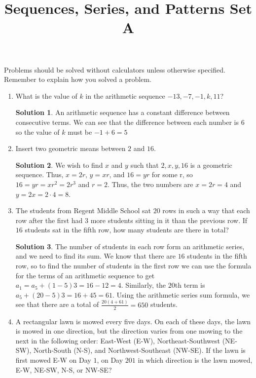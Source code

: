 \documentclass{article}
\title{Sequences, Series, and Patterns Set A}
\date{}
\author{}
\theoremstyle{definition}
\newtheorem*{solution}{Solution}
\begin{document}
    \maketitle
    \noindent Problems should be solved without calculators unless otherwise specified. Remember to explain how you solved a problem.
    \begin{enumerate}
        \item What is the value of $k$ in the arithmetic sequence $-13, -7, -1, k, 11$?
        \begin{solution}
            An arithmetic sequence has a constant difference between consecutive
            terms. We can see that the difference between each number is $6$ so
            the value of $k$ must be $-1 + 6 = 5$
        \end{solution}
        \item Insert two geometric means between $2$ and $16$.
        \begin{solution}
            We wish to find $x$ and $y$ such that $2, x, y, 16$ is a geometric
            sequence. Thus, $x = 2r$, $y = xr$, and $16 = yr$ for some r, so $16
            = yr = xr^2 = 2r^3$ and $r = 2$. Thus, the two numbers are $x = 2r =
            4$ and $y = 2x = 2 \cdot 4 = 8$.
        \end{solution}
        \item The students from Regent Middle School sat $20$ rows in such a way
        that each row after the first had $3$ more students sitting in it than
        the previous row. If $16$ students sat in the fifth row, how many
        students are there in total?
        \begin{solution}
            The number of students in each row form an arithmetic series, and we
            need to find its sum. We know that there are $16$ students in the
            fifth row, so to find the number of students in the first row we can
            use the formula for the terms of an arithmetic sequence to get $a_1
            = a_5 + (1 - 5)3 = 16 - 12 = 4$. Similarly, the $20$th term is $a_5
            + (20 - 5)3 = 16 + 45 = 61$. Using the arithmetic series sum
            formula, we see that there are a total of $\frac{20(4 + 61)}{2} =
            650$ students.
        \end{solution}
        \item A rectangular lawn is mowed every five days. On each of these days, the lawn is mowed in one direction, but the direction varies from one mowing to the next in the following order: East-West (E-W), Northeast-Southwest (NE-SW), North-South (N-S), and Northwest-Southeast (NW-SE). If the lawn is first mowed E-W on Day $1$, on Day $201$ in which direction is the lawn mowed, E-W, NE-SW, N-S, or NW-SE?

\end{enumerate}
\end{document}
